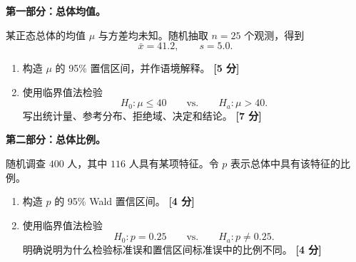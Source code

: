 \documentclass[11pt,a4paper]{article}
\newcommand{\pts}[1]{\hfill\textbf{[#1 分]}}
\begin{document}
\begin{questionbox}[第 2 题：单总体均值与总体比例（20 分）]
\textbf{第一部分：总体均值。}

某正态总体的均值 $\mu$ 与方差均未知。随机抽取 $n=25$ 个观测，得到
\[
  \bar x=41.2,
  \qquad
  s=5.0.
\]

\begin{enumerate}
  \item 构造 $\mu$ 的 95\% 置信区间，并作语境解释。 \pts{5}

  \item 使用临界值法检验
  \[
    H_0:\mu\leq40
    \qquad\text{vs.}\qquad
    H_a:\mu>40.
  \]
  写出统计量、参考分布、拒绝域、决定和结论。 \pts{7}
\end{enumerate}

\textbf{第二部分：总体比例。}

随机调查 $400$ 人，其中 $116$ 人具有某项特征。令 $p$ 表示总体中具有该特征的比例。

\begin{enumerate}[resume]
  \item 构造 $p$ 的 95\% Wald 置信区间。 \pts{4}

  \item 使用临界值法检验
  \[
    H_0:p=0.25
    \qquad\text{vs.}\qquad
    H_a:p\ne0.25.
  \]
  明确说明为什么检验标准误和置信区间标准误中的比例不同。 \pts{4}
\end{enumerate}
\end{questionbox}
\end{document}
